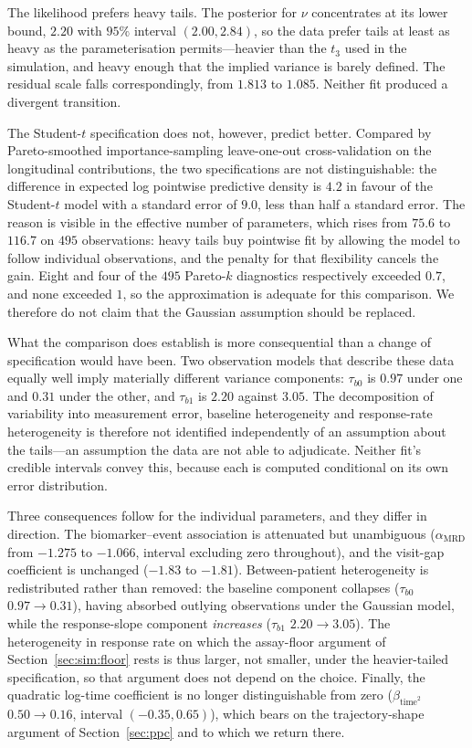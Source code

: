 \documentclass[11pt]{article}
\begin{document}
The likelihood prefers heavy tails. The posterior for $\nu$ concentrates at its
lower bound, $2.20$ with $95\%$ interval $(2.00,2.84)$, so the data prefer tails
at least as heavy as the parameterisation permits---heavier than the $t_3$ used
in the simulation, and heavy enough that the implied variance is barely defined.
The residual scale falls correspondingly, from $1.813$ to $1.085$. Neither fit
produced a divergent transition.

The Student-$t$ specification does not, however, predict better. Compared by
Pareto-smoothed importance-sampling leave-one-out cross-validation on the
longitudinal contributions, the two specifications are not distinguishable: the
difference in expected log pointwise predictive density is $4.2$ in favour of
the Student-$t$ model with a standard error of $9.0$, less than half a standard
error. The reason is visible in the effective number of parameters, which rises
from $75.6$ to $116.7$ on $495$ observations: heavy tails buy pointwise fit by
allowing the model to follow individual observations, and the penalty for that
flexibility cancels the gain. Eight and four of the $495$ Pareto-$k$ diagnostics
respectively exceeded $0.7$, and none exceeded $1$, so the approximation is
adequate for this comparison. We therefore do not claim that the Gaussian assumption should be
replaced.

What the comparison does establish is more consequential than a change of
specification would have been. Two observation models that describe these data
equally well imply materially different variance components:
$\tau_{b0}$ is $0.97$ under one and $0.31$ under the other, and $\tau_{b1}$ is
$2.20$ against $3.05$. The decomposition of variability into measurement error,
baseline heterogeneity and response-rate heterogeneity is therefore not
identified independently of an assumption about the tails---an assumption the
data are not able to adjudicate. Neither fit's credible intervals convey this,
because each is computed conditional on its own error distribution.

Three consequences follow for the individual parameters, and they differ in
direction. The biomarker--event association is attenuated but unambiguous
($\alpha_{\mathrm{MRD}}$ from $-1.275$ to $-1.066$, interval excluding zero
throughout), and the visit-gap coefficient is unchanged ($-1.83$ to $-1.81$).
Between-patient heterogeneity is redistributed rather than removed: the baseline
component collapses ($\tau_{b0}$ $0.97\to0.31$), having absorbed outlying
observations under the Gaussian model, while the response-slope component
\emph{increases} ($\tau_{b1}$ $2.20\to3.05$). The heterogeneity in response rate
on which the assay-floor argument of Section~\ref{sec:sim:floor} rests is thus
larger, not smaller, under the heavier-tailed specification, so that argument
does not depend on the choice. Finally, the quadratic log-time
coefficient is no longer distinguishable from zero ($\beta_{\mathrm{time}^2}$
$0.50\to0.16$, interval $(-0.35,0.65)$), which bears on the trajectory-shape
argument of Section~\ref{sec:ppc} and to which we return there.
\end{document}
